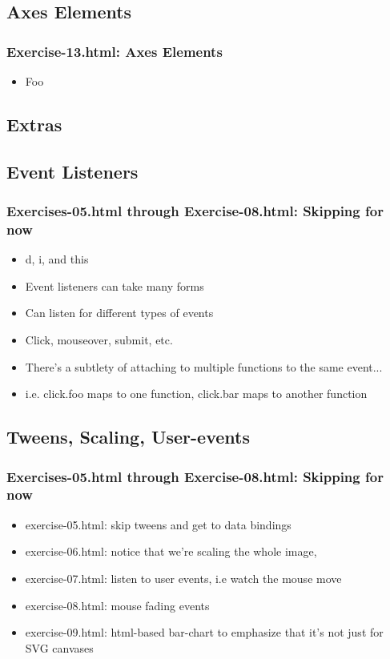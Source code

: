 \documentclass{beamer}
\begin{document}
\subsection{Axes Elements}

\begin{frame}
    \frametitle{Exercise-13.html: Axes Elements}
    \begin{itemize}
    \item Foo
    \end{itemize} 
\end{frame}



\subsection{Extras}

\subsection{Event Listeners}
\begin{frame}
    \frametitle{Exercises-05.html through Exercise-08.html: Skipping for now}
    \begin{itemize}
    \item d, i, and this
    \item Event listeners can take many forms
    \item Can listen for different types of events
    \item Click, mouseover, submit, etc.
    \item There's a subtlety of attaching to multiple functions to the same event...
    \item i.e. click.foo maps to one function, click.bar maps to another function
    \end{itemize}
\end{frame}


\subsection{Tweens, Scaling, User-events}

\begin{frame}
    \frametitle{Exercises-05.html through Exercise-08.html: Skipping for now}
    \begin{itemize}
    \item exercise-05.html: skip tweens and get to data bindings
    \item exercise-06.html: notice that we're scaling the whole image,
    \item exercise-07.html: listen to user events, i.e watch the mouse move
    \item exercise-08.html: mouse fading events
    \item exercise-09.html: html-based bar-chart to emphasize that it's not just for SVG canvases
    \end{itemize}
\end{frame}
\end{document}
